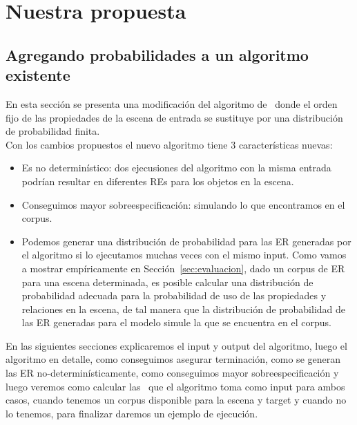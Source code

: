 \chapter{Nuestra propuesta}
\label{sec:algoritmo}
\section{Agregando probabilidades a un algoritmo existente}

En esta secci\'on se presenta una modificaci\'on del algoritmo
de~\cite{arec2:2008:Areces} donde el orden fijo de las propiedades de
la escena de entrada se sustituye por una distribuci\'on de probabilidad finita. \\

Con los cambios propuestos el nuevo algoritmo tiene 3 caracter\'isticas nuevas:
\begin{itemize}
 \item Es no determin\'istico: dos ejecusiones del algoritmo con la
misma entrada podr\'{i}an resultar en diferentes REs para los objetos en la escena.\\

 \item Conseguimos mayor sobreespecificaci\'on: simulando lo que encontramos en el corpus.\\

 \item Podemos generar una distribuci\'on de probabilidad
para las ER generadas por el algoritmo si lo ejecutamos muchas veces con
el mismo input. Como vamos a mostrar emp\'{i}ricamente en
Secci\'on~\ref{sec:evaluacion}, dado un corpus de ER para una escena determinada,
es posible calcular una distribuci\'on de probabilidad adecuada para la
probabilidad de uso de las propiedades y relaciones en la escena, de tal manera que
la distribuci\'on de probabilidad de las ER generadas para el modelo
simule la que se encuentra en el corpus.\\
\end{itemize}

En las siguientes secciones explicaremos el input y output del algoritmo, luego el algoritmo en detalle, como conseguimos asegurar terminaci\'on, como se generan las ER no-determin\'isticamente, como conseguimos mayor sobreespecificaci\'on y luego veremos como calcular las \puse\ que el algoritmo toma como input para ambos casos, cuando tenemos un corpus disponible para la escena y target y cuando no lo tenemos, para finalizar daremos un ejemplo de ejecuci\'on.

